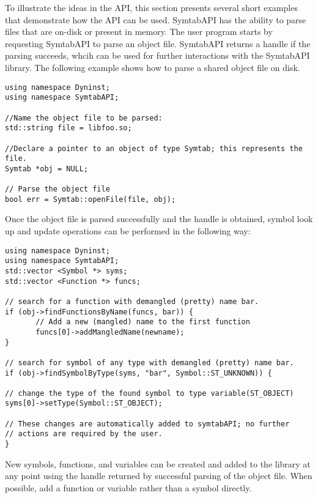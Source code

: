 To illustrate the ideas in the API, this section presents several short examples
that demonstrate how the API can be used.  SymtabAPI has the ability to parse
files that are on-disk or present in memory. The user program starts by
requesting SymtabAPI to parse an object file. SymtabAPI returns a handle if the
parsing succeeds, whcih can be used for further interactions with the SymtabAPI
library. The following example shows how to parse a shared object file on disk.

\lstset{numbers=left, numberstyle=\tiny, stepnumber=5, numbersep=5pt}
\begin{lstlisting}
using namespace Dyninst;
using namespace SymtabAPI;

//Name the object file to be parsed:
std::string file = libfoo.so;

//Declare a pointer to an object of type Symtab; this represents the file.
Symtab *obj = NULL;

// Parse the object file
bool err = Symtab::openFile(file, obj);
\end{lstlisting}

Once the object file is parsed successfully and the handle is obtained, symbol look up and update operations can be performed in the following way:

\begin{lstlisting}
using namespace Dyninst;
using namespace SymtabAPI;
std::vector <Symbol *> syms;
std::vector <Function *> funcs;

// search for a function with demangled (pretty) name bar.
if (obj->findFunctionsByName(funcs, bar)) {
       // Add a new (mangled) name to the first function
       funcs[0]->addMangledName(newname);
}

// search for symbol of any type with demangled (pretty) name bar.
if (obj->findSymbolByType(syms, "bar", Symbol::ST_UNKNOWN)) {

// change the type of the found symbol to type variable(ST_OBJECT)
syms[0]->setType(Symbol::ST_OBJECT);

// These changes are automatically added to symtabAPI; no further
// actions are required by the user.
}
\end{lstlisting}

New symbols, functions, and variables can be created and added to the library at any point using the handle returned by successful parsing of the object file. When possible, add a function or variable rather than a symbol directly. 

